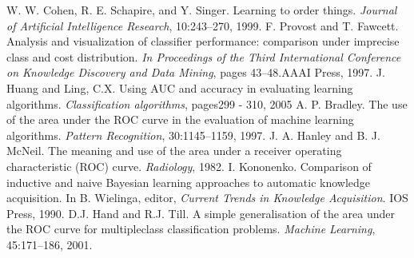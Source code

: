\documentclass[twoside, twocolumn, 12pt]{article}
\begin{document}
\begin{thebibliography}{99}

W. W. Cohen, R. E. Schapire, and Y. Singer. Learning to order things. \textit{Journal of Artificial Intelligence Research}, 10:243–270, 1999.
F. Provost and T. Fawcett. Analysis and visualization of classifier performance: comparison under imprecise class and cost distribution. \textit{In Proceedings of the Third International Conference on Knowledge Discovery and Data Mining}, pages 43–48.AAAI Press, 1997.
J. Huang and Ling, C.X. Using {AUC} and accuracy in evaluating learning algorithms. \textit{Classification algorithms}, pages299 - 310, 2005
A. P. Bradley. The use of the area under the ROC curve in the evaluation of machine learning algorithms. \textit{Pattern Recognition}, 30:1145–1159, 1997.
J. A. Hanley and B. J. McNeil. The meaning and use of the area under a receiver operating characteristic (ROC) curve. \textit{Radiology}, 1982.
 I. Kononenko. Comparison of inductive and naive Bayesian learning approaches to automatic knowledge acquisition. In B. Wielinga, editor, \textit{Current Trends in Knowledge Acquisition}. IOS Press, 1990.
 D.J. Hand and R.J. Till. A simple generalisation of the area under the ROC curve for multipleclass classification problems. \textit{Machine Learning}, 45:171–186, 2001.

\end{thebibliography}
\end{document}
